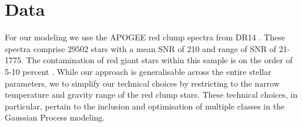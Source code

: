 \documentclass[a4paper,fleqn,usenatbib]{mnras}
\begin{document}










\section{Data}
\label{sec:data}

For our modeling we use the APOGEE red clump spectra from DR14 \citep{Majewski2017, Bovy2015}. These spectra comprise $29502$ stars with a mean SNR of 210 and range of SNR of 21-1775.  The contamination of red giant stars within this sample is on the order of 5-10 percent \citep{Bovy2015}. While our approach is generalisable across the entire stellar parameters, we to simplify our technical choices by restricting to the narrow temperature and gravity range of the red clump stars. These technical choices, in particular,  pertain to the inclusion and optimisation of multiple classes in the Gaussian Process modeling.

\end{document}
